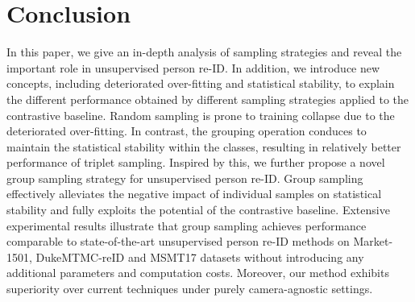 \documentclass[lettersize,journal]{IEEEtran}
\begin{document}
\section{Conclusion}
In this paper, we give an in-depth analysis of sampling strategies and reveal the important role in unsupervised person re-ID. 
In addition, we introduce new concepts, including deteriorated over-fitting and statistical stability, to explain the different performance obtained by different sampling strategies applied to the contrastive baseline. Random sampling is prone to training collapse due to the deteriorated over-fitting. In contrast, the grouping operation conduces to maintain the statistical stability within the classes, resulting in relatively better performance of triplet sampling.
Inspired by this, we further propose a novel group sampling strategy for unsupervised person re-ID. 
Group sampling effectively alleviates the negative impact of individual samples on statistical stability and fully exploits the potential of the contrastive baseline.
Extensive experimental results illustrate that group sampling achieves performance comparable to state-of-the-art unsupervised person re-ID methods on Market-1501, DukeMTMC-reID and MSMT17 datasets without introducing any additional parameters and computation costs. Moreover, our method exhibits superiority over current techniques under purely camera-agnostic settings.



\ifCLASSOPTIONcaptionsoff
  \newpage
\fi

{


}
\end{document}
